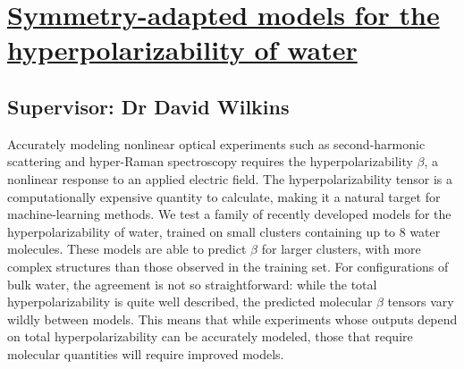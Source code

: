 \section{\href{https://doi.org/10.1088/1361-648X/adbfec}{Symmetry-adapted models for the hyperpolarizability of water}}

\subsection*{Supervisor: Dr David Wilkins}



Accurately modeling nonlinear optical experiments such as second-harmonic 
scattering and hyper-Raman spectroscopy requires the hyperpolarizability 
$\beta$, a nonlinear response to an applied electric field. The 
hyperpolarizability tensor is a computationally expensive quantity to 
calculate, making it a natural target for machine-learning methods. We test 
a family of recently developed models for the hyperpolarizability of water, 
trained on small clusters containing up to 8 water molecules. These models 
are able to predict $\beta$ for larger clusters, with more complex structures 
than those observed in the training set. For configurations of bulk water, 
the agreement is not so straightforward: while the total hyperpolarizability 
is quite well described, the predicted molecular $\beta$ tensors vary wildly 
between models. This means that while experiments whose outputs depend on 
total hyperpolarizability can be accurately modeled, those that require 
molecular quantities will require improved models.

